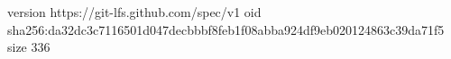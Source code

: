 version https://git-lfs.github.com/spec/v1
oid sha256:da32dc3c7116501d047decbbbf8feb1f08abba924df9eb020124863c39da71f5
size 336
